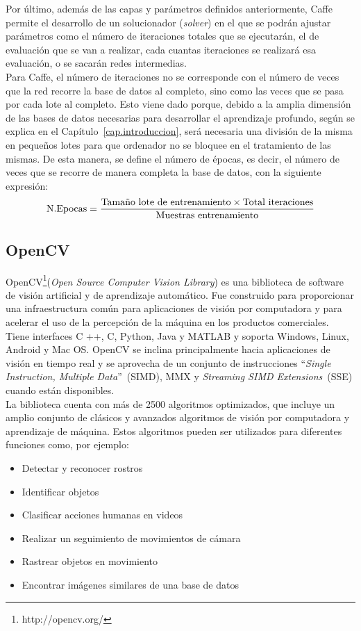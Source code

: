 Por último, además de las capas y parámetros definidos anteriormente, Caffe permite el desarrollo de un solucionador (\textit{solver}) en el que se podrán ajustar parámetros como el número de iteraciones totales que se ejecutarán, el de evaluación que se van a realizar, cada cuantas iteraciones se realizará esa evaluación, o se sacarán redes intermedias.\\

Para Caffe, el número de iteraciones no se corresponde con el número de veces que la red recorre la base de datos al completo, sino como las veces que se pasa por cada lote al completo. Esto viene dado porque, debido a la amplia dimensión de las bases de datos necesarias para desarrollar el aprendizaje profundo, según se explica en el Capítulo~\ref{cap.introduccion}, será necesaria una división de la misma en pequeños lotes para que ordenador no se bloquee en el tratamiento de las mismas. De esta manera, se define el número de épocas, es decir, el número de veces que se recorre de manera completa la base de datos, con la siguiente expresión:
$$\textup{N.Epocas}=\frac{\textup{Tamaño lote de entrenamiento}\times \textup{Total iteraciones}}{\textup{Muestras entrenamiento}} $$

\subsection{OpenCV}
OpenCV\footnote{http://opencv.org/}(\textit{Open Source Computer Vision Library}) es una biblioteca de software de visión artificial y de aprendizaje automático. Fue construido para proporcionar una infraestructura común para aplicaciones de visión por computadora y para acelerar el uso de la percepción de la máquina en los productos comerciales. Tiene interfaces C ++, C, Python, Java y MATLAB y soporta Windows, Linux, Android y Mac OS. OpenCV se inclina principalmente hacia aplicaciones de visión en tiempo real y se aprovecha de un conjunto de instrucciones ``\textit{Single Instruction, Multiple Data}''~(SIMD), MMX y \textit{Streaming SIMD Extensions}~(SSE) cuando están disponibles.\\

La biblioteca cuenta con más de 2500 algoritmos optimizados, que incluye un amplio conjunto de clásicos y avanzados algoritmos de visión por computadora y aprendizaje de máquina. Estos algoritmos pueden ser utilizados para diferentes funciones como, por ejemplo:

\begin{itemize}
	\item Detectar y reconocer rostros
	\item Identificar objetos
	\item Clasificar acciones humanas en videos
	\item Realizar un seguimiento de movimientos de cámara
	\item Rastrear objetos en movimiento
	\item Encontrar imágenes similares de una base de datos
\end{itemize}

